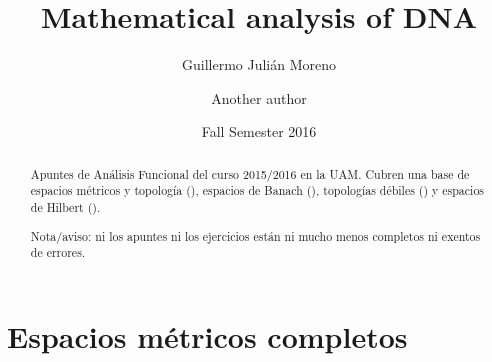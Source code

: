 \documentclass[palatino]{nicenotes}
\title{Mathematical analysis of DNA}
\author{Guillermo Julián Moreno \and Another author}
\date{Fall Semester 2016}
\begin{document}
\begin{abstract}
Apuntes de Análisis Funcional del curso 2015/2016 en la UAM. Cubren una base de espacios métricos y topología (), espacios de Banach (), topologías débiles () y espacios de Hilbert ().

Nota/aviso: ni los apuntes ni los ejercicios están ni mucho menos completos ni exentos de errores.
\end{abstract}

\pagestyle{plain}
\maketitle

\tableofcontents
\newpage

\chapter{Espacios métricos completos}
\end{document}
